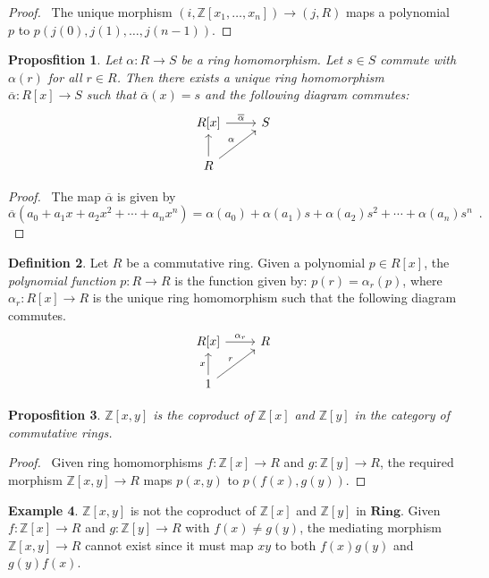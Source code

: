 \documentclass{book}
\let\qed\relax
\newtheorem{prop}{Proposfition}[chapter]
\theoremstyle{definition}
\newtheorem{df}[prop]{Definition}
\newtheorem{ex}[prop]{Example}
\newcommand{\Ring}{\ensuremath{\mathbf{Ring}}}
\begin{document}
\begin{proof}
\pf\ The unique morphism $(i, \mathbb{Z}[x_1, \ldots, x_n]) \rightarrow (j, R)$ maps a polynomial $p$ to $p(j(0), j(1), \ldots, j(n-1))$. \qed
\end{proof}

\begin{prop}
Let $\alpha : R \rightarrow S$ be a ring homomorphism. Let $s \in S$ commute with $\alpha(r)$ for all $r \in R$. Then there exists a unique ring homomorphism $\overline{\alpha} : R[x] \rightarrow S$ such that $\overline{\alpha}(x) = s$ and the following diagram commutes:
\[ \begin{tikzcd}
R[x] \arrow[r,"\overline{\alpha}"] & S \\
R \arrow[u] \arrow[ur,"\alpha"]
\end{tikzcd} \]
\end{prop}

\begin{proof}
\pf\ The map $\overline{\alpha}$ is given by
\[ \overline{\alpha}(a_0 + a_1 x + a_2 x^2 + \cdots + a_n x^n) = \alpha(a_0) + \alpha(a_1) s + \alpha(a_2) s^2 + \cdots + \alpha(a_n) s^n \enspace . \]
\qed
\end{proof}

\begin{df}
Let $R$ be a commutative ring.
Given a polynomial $p \in R[x]$, the \emph{polynomial function} $p : R \rightarrow R$ is the function given by: $p(r) = \alpha_r(p)$, where $\alpha_r : R[x] \rightarrow R$ is the unique ring homomorphism such that the following diagram commutes.
\[ \begin{tikzcd}
R[x] \arrow[r,"\alpha_r"] & R \\
1 \arrow[u,"x"] \arrow[ur,"r"]
\end{tikzcd} \]
\end{df}

\begin{prop}
$\mathbb{Z}[x,y]$ is the coproduct of $\mathbb{Z}[x]$ and $\mathbb{Z}[y]$ in the category of commutative rings.
\end{prop}

\begin{proof}
\pf\ Given ring homomorphisms $f : \mathbb{Z}[x] \rightarrow R$ and $g : \mathbb{Z}[y] \rightarrow R$, the required morphism $\mathbb{Z}[x,y] \rightarrow R$ maps $p(x,y)$ to $p(f(x),g(y))$. \qed
\end{proof}

\begin{ex}
$\mathbb{Z}[x,y]$ is not the coproduct of $\mathbb{Z}[x]$ and $\mathbb{Z}[y]$ in $\Ring$. Given $f : \mathbb{Z}[x] \rightarrow R$ and $g : \mathbb{Z}[y] \rightarrow R$ with $f(x) \neq g(y)$, the mediating morphism $\mathbb{Z}[x,y] \rightarrow R$ cannot exist since it must map $xy$ to both $f(x)g(y)$ and $g(y)f(x)$. \qed
\end{ex}
\end{document}
